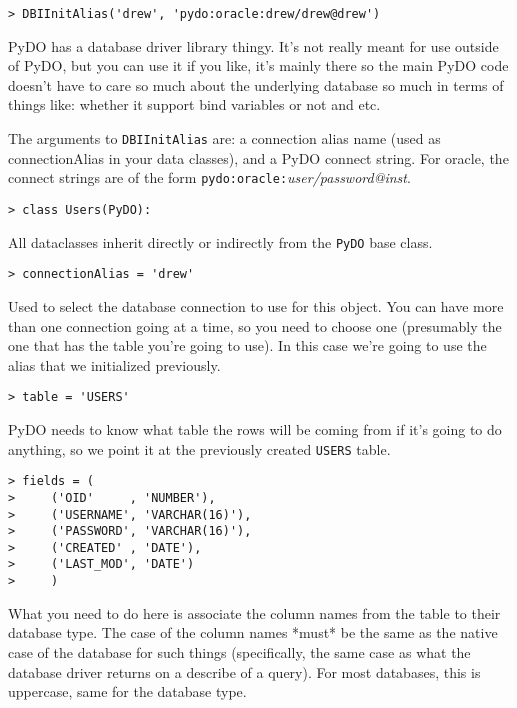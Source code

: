 \documentclass[titlepage]{manual}
\begin{document}
\begin{verbatim}
> DBIInitAlias('drew', 'pydo:oracle:drew/drew@drew')
\end{verbatim}

PyDO has a database driver library thingy.  It's not really meant for use 
outside of PyDO, but you can use it if you like, it's mainly there so the main
PyDO code doesn't have to care so much about the underlying database so much
in terms of things like: whether it support bind variables or not and etc.

The arguments to \texttt{DBIInitAlias} are: a connection alias name
(used as connectionAlias in your data classes), and a PyDO connect
string.  For oracle, the connect strings are of the form
\texttt{pydo:oracle:}\emph{user/password@inst}.

\begin{verbatim}
> class Users(PyDO):
\end{verbatim}

All dataclasses inherit directly or indirectly from the \texttt{PyDO}
base class.

\begin{verbatim}
> connectionAlias = 'drew'
\end{verbatim}

Used to select the database connection to use for this object.  You
can have more than one connection going at a time, so you need to
choose one (presumably the one that has the table you're going to
use).  In this case we're going to use the alias that we initialized
previously. 

\begin{verbatim}
> table = 'USERS'
\end{verbatim}

PyDO needs to know what table the rows will be coming from if it's
going to do anything, so we point it at the previously created
\texttt{USERS} table.

\begin{verbatim}
> fields = (
>     ('OID'     , 'NUMBER'),
>     ('USERNAME', 'VARCHAR(16)'),
>     ('PASSWORD', 'VARCHAR(16)'),
>     ('CREATED' , 'DATE'),
>     ('LAST_MOD', 'DATE')
>     )
\end{verbatim}

What you need to do here is associate the
column names from the table to their database type.  The case of the
column names *must* be the same as the native case of the database for
such things (specifically, the same case as what the database driver
returns on a describe of a query).  For most databases, this is
uppercase, same for the database type. 
\end{document}
